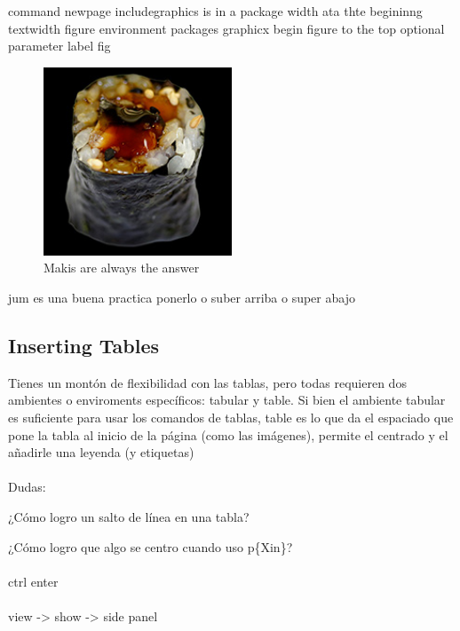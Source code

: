 \documentclass{article}
\begin{document}
	command
	newpage
	includegraphics is in a package width ata thte begininng
	textwidth
	figure environment
	packages
		graphicx
	begin figure to the top optional parameter
	label fig
	
	\begin{figure}
		\centering
		\includegraphics[width=0.5\textwidth]{makis}
		\caption{Makis are always the answer}\label{fig:first-figure}
	\end{figure}
	jum
	es una buena practica ponerlo o suber arriba o super abajo
	
	\newpage
	\subsection{Inserting Tables}
	
	Tienes un montón de flexibilidad con las tablas, pero todas requieren dos ambientes o enviroments específicos: tabular y table. Si bien el ambiente tabular es suficiente para usar los comandos de tablas, table es lo que da el espaciado que pone la tabla al inicio de la página (como las imágenes), permite el centrado y el añadirle una leyenda (y etiquetas)
	\\ \\
	Dudas:
	
	¿Cómo logro un salto de línea en una tabla?
	
	¿Cómo logro que algo se centro cuando uso p\{Xin\}?
	\\ \\
	ctrl enter
	\\ \\
	view -> show -> side panel
	
\end{document}
